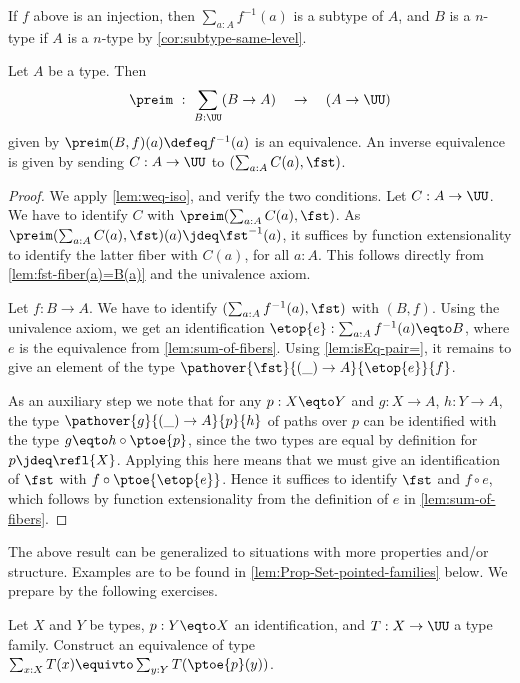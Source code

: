 If $f$ above is an injection, then $\sum_{a:A} f^{-1}(a)$ is a subtype of $A$,
and $B$ is a $n$-type if $A$ is a $n$-type by \cref{cor:subtype-same-level}.

\begin{lemma}\label{lem:typefamiliesandfibrations}
Let $A$ be a type. Then
\[
\preim ~:~ \sum_{B:\UU}(B\to A) \quad\to\quad (A\to\UU)
\]
given by $\preim(B,f)(a)\defeq f^{-1}(a)$ is an equivalence.
An inverse equivalence is given by sending $C:A\to\UU$ to
$(\sum_{a:A}C(a), \fst)$.
\end{lemma}

\begin{proof}
We apply \cref{lem:weq-iso}, and verify the two conditions.
Let $C:A\to\UU$. We have to identify $C$ with $\preim(\sum_{a:A}C(a), \fst)$.
As $\preim(\sum_{a:A}C(a), \fst)(a)\jdeq \fst^{-1}(a)$, it suffices
by function extensionality to identify the latter fiber with
$C(a)$, for all $a:A$. This follows directly from
\cref{lem:fst-fiber(a)=B(a)} and the univalence axiom.

Let $f: B\to A$.
We have to identify $(\sum_{a:A} f^{-1}(a), \fst)$ with $(B,f)$.
Using the univalence axiom, we get an identification
$\etop{e} : \sum_{a:A} f^{-1}(a) \eqto B$, where $e$ is the equivalence
from \cref{lem:sum-of-fibers}. Using \cref{lem:isEq-pair=},
it remains to give an element of the type
$\pathover{\fst}{(\_)\to A}{\etop{e}}{f}$.

As an auxiliary step we note that for any $p: X \eqto Y$ and $g:X\to A$,
$h:Y\to A$, the type $\pathover{g}{(\_)\to A}{p}{h}$ of paths over $p$
can be identified with the type $g \eqto h\circ{\ptoe{p}}$, since the two
types are equal by definition for $p\jdeq\refl{X}$.
Applying this here means that we must give an identification of
$\fst$ with $f\circ{\ptoe{\etop{e}}}$. Hence it suffices
to identify $\fst$ and $f\circ e$,
which follows by function extensionality from the definition
of $e$ in \cref{lem:sum-of-fibers}.
\end{proof}

The above result can be generalized to situations with more
properties and/or structure. Examples are to be found in
\cref{lem:Prop-Set-pointed-families} below.
We prepare by the following exercises.

\begin{xca}\label{xca:sum-base-path}
Let $X$ and $Y$ be types, $p: Y\eqto X$ an identification,
and $T: X\to\UU$ a type family.
Construct an equivalence of type
$\sum_{x:X} T(x) \equivto \sum_{y:Y} T(\ptoe{p}(y))$.
\end{xca}

